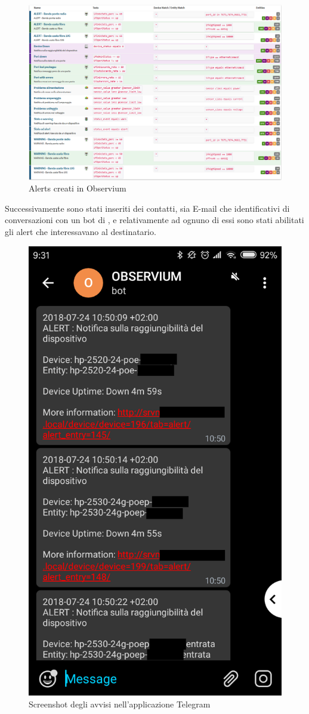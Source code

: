 \documentclass[Realizzazione.tex]{subfiles}
\begin{document}
\begin{figure}[H]
	\centering
	\includegraphics[width=1.1\linewidth]{"images/alerts"}
	\caption{Alerts creati in Observium}
	\label{fig:Alerts creati in Observium}
\end{figure}

Successivamente sono stati inseriti dei contatti, sia E-mail che identificativi di conversazioni con un bot di , e relativamente ad ognuno di essi sono stati abilitati gli alert che interessavano al destinatario.

\begin{figure}[H]
	\centering
	\includegraphics[width=0.4\linewidth]{"images/alerttelegram"}
	\caption{Screenshot degli avvisi nell'applicazione Telegram}
	\label{fig:Screenshot degli avvisi nell'applicazione Telegram}
\end{figure}
\end{document}
